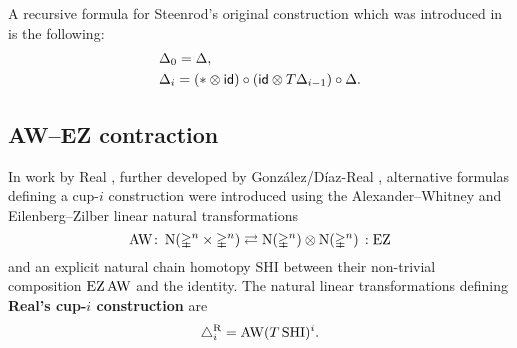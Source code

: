 A recursive formula for Steenrod's original construction which was introduced in \cite{medina2022dennis} is the following:
\begin{equation}\label{e:prop cup-i}
	\begin{split}
		& \Delta_0 = \Delta, \\
		& \Delta_i =
		(\ast \otimes \mathsf{id}) \circ (\mathsf{id} \otimes T \Delta_{i-1}) \circ \Delta.
	\end{split}
\end{equation}

\subsection{AW--EZ contraction}\label{ss:real}

In work by Real \cite{real1996computability}, further developed by Gonz\'alez\-/D\'iaz\--Real \cite{gonzalez-diaz1999steenrod, gonzalez2003computation, gonzalez-diaz2005cocyclic}, alternative formulas defining a \mbox{cup-$i$} construction were introduced using the Alexander--Whitney and Eilenberg--Zilber linear natural transformations
\[
\operatorname{AW} \colon \operatorname{N}(\mathbb{\Delta}^n \times \mathbb{\Delta}^n)
\rightleftarrows
\operatorname{N}(\mathbb{\Delta}^n) \otimes \operatorname{N}(\mathbb{\Delta}^n) \,: \operatorname{EZ}
\]
and an explicit natural chain homotopy $\mathrm{SHI}$ between their non-trivial composition $\operatorname{EZ} \operatorname{AW}$ and the identity.
The natural linear transformations defining \textbf{Real's \mbox{cup-$i$} construction} are
\[
\triangle^{\mathrm{R}}_i = \operatorname{AW} (T \, \mathrm{SHI})^i.
\]


